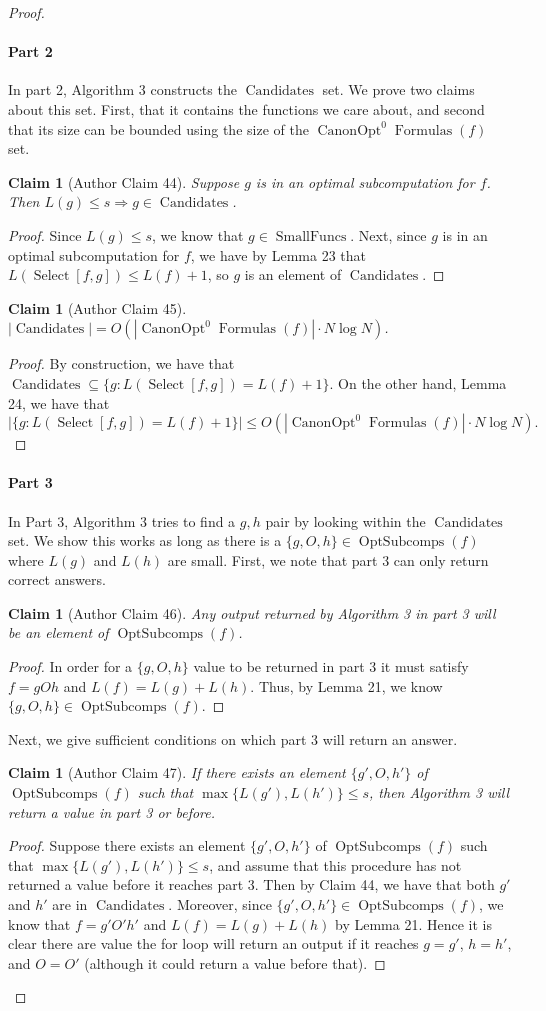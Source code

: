 \documentclass[10pt,a4paper]{article}
\newtheorem{ntclaim}[nttheorem]{Claim}
\newcommand{\Opt}{\operatorname{OptSubcomps}}
\newcommand{\Canon}[1]{\operatorname{CanonOpt}^{#1}\!\operatorname{Formulas}}
\newcommand{\Select}{\operatorname{Select}}
\newcommand{\Candidates}{\operatorname{Candidates}}
\begin{document}
\begin{proof}
\paragraph{Part 2}
In part 2, Algorithm 3 constructs the $\Candidates$ set. We prove two claims about this set. First, that it contains the functions we care about, and second that its size can be bounded using the size of the $\Canon{0}(f)$ set.
\begin{ntclaim}[Author Claim 44]
Suppose $g$ is in an optimal subcomputation for $f$. Then $L(g)\leq s\Longrightarrow g\in\Candidates$.
\end{ntclaim}
\begin{proof}
Since $L(g)\leq s$, we know that $g\in\operatorname{SmallFuncs}$. Next, since $g$ is in an optimal subcomputation for $f$, we have by Lemma 23 that $L(\Select[f,g])\leq L(f)+1$, so $g$ is an element of $\Candidates$.
\end{proof}
\begin{ntclaim}[Author Claim 45]
$|\Candidates|=O(|\Canon{0}(f)|\cdot N\log N)$.
\end{ntclaim}
\begin{proof}
By construction, we have that $\Candidates\subseteq\{g:L(\Select[f,g])=L(f)+1\}$. On the other hand, Lemma 24, we have that
\[|\{g:L(\Select[f,g])=L(f)+1\}|\leq O(|\Canon{0}(f)|\cdot N\log N).\]
\end{proof}
\paragraph{Part 3}
In Part 3, Algorithm 3 tries to find a $g,h$ pair by looking within the $\Candidates$ set. We show this works as long as there is a $\{g,O,h\}\in\Opt(f)$ where $L(g)$ and $L(h)$ are small.
First, we note that part 3 can only return correct answers.
\begin{ntclaim}[Author Claim 46]
Any output returned by Algorithm 3 in part 3 will be an element of $\Opt(f)$.
\end{ntclaim}
\begin{proof}
In order for a $\{g,O,h\}$ value to be returned in part 3 it must satisfy $f=gOh$ and $L(f)=L(g)+L(h)$. Thus, by Lemma 21, we know $\{g,O,h\}\in\Opt(f)$.
\end{proof}
Next, we give sufficient conditions on which part 3 will return an answer.
\begin{ntclaim}[Author Claim 47]
If there exists an element $\{g',O,h'\}$ of $\Opt(f)$ such that $\max\{L(g'),L(h')\}\leq s$, then Algorithm 3 will return a value in part 3 or before.
\end{ntclaim}
\begin{proof}
Suppose there exists an element $\{g',O,h'\}$ of $\Opt(f)$ such that $\max\{L(g'),L(h')\}\leq s$, and assume that this procedure has not returned a value before it reaches part 3. Then by Claim 44, we have that both $g'$ and $h'$ are in $\Candidates$. Moreover, since $\{g',O,h'\}\in\Opt(f)$, we know that $f=g'O'h'$ and $L(f)=L(g)+L(h)$ by Lemma 21. Hence it is clear there are value the for loop will return an output if it reaches $g=g'$, $h=h'$, and $O=O'$ (although it could return a value before that).
\end{proof}

\end{proof}
\end{document}
